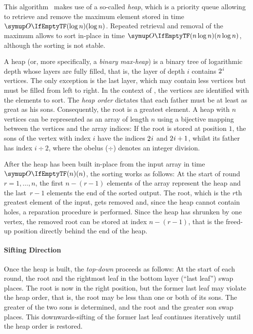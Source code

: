 \section{\texorpdfstring{\HS{}}{HeapSort}}
\label{sec:tasklet:heap}


This algorithm~\cites{floyd1964treesort}{williams1964heapsort}[Chapter~2.2.5]{wirth1975algorithmen} makes use of a so-called \emph{heap}, which is a priority queue allowing to retrieve and remove the maximum element stored in time \(\bigoh{\log n}\).
Repeated retrieval and removal of the maximum allows to sort in-place in time \(\bigoh{n \log n}\), although the sorting is not stable.

A heap (or, more specifically, a \emph{binary max-heap}) is a binary tree of logarithmic depth whose layers are fully filled, that is, the layer of depth \(i\) contains \(2\mspace{1mu}^i\) vertices.
The only exception is the last layer, which may contain less vertices but must be filled from left to right.
In the context of \HS{}, the vertices are identified with the elements to sort.
The \emph{heap order} dictates that each father must be at least as great as his sons.
Consequently, the root is a greatest element.
A heap with \(n\) vertices can be represented as an array of length \(n\) using a bijective mapping between the vertices and the array indices:
If the root is stored at position \(1\), the sons of the vertex with index \(i\) have the indices \(2 \mspace{1mu} i\) and \(2 \mspace{1mu} i + 1\), whilst its father has index \(i \div 2\), where the obelus (\(\div\)) denotes an integer division.

After the heap has been built in-place from the input array in time \(\bigoh{n}\), the sorting works as follows:
At the start of round~\(r = 1, \dots, n\), the first \(n - (r - 1)\) elements of the array represent the heap and the last~\(r - 1\) elements the end of the sorted output.
The root, which is the \(r\)th greatest element of the input, gets removed and, since the heap cannot contain holes, a reparation procedure is performed.
Since the heap has shrunken by one vertex, the removed root can be stored at index \(n - (r - 1)\), that is the freed-up position directly behind the end of the heap.


\paragraph{Sifting Direction}
Once the heap is built, the \emph{top-down} \HS{} proceeds as follows:
At the start of each round, the root and the rightmost leaf in the bottom layer (\enquote{last leaf}) swap places.
The root is now in the right position, but the former last leaf may violate the heap order, that is, the root may be less than one or both of its sons.
The greater of the two sons is determined, and the root and the greater son swap places.
This downwards-sifting of the former last leaf continues iteratively until the heap order is restored.

